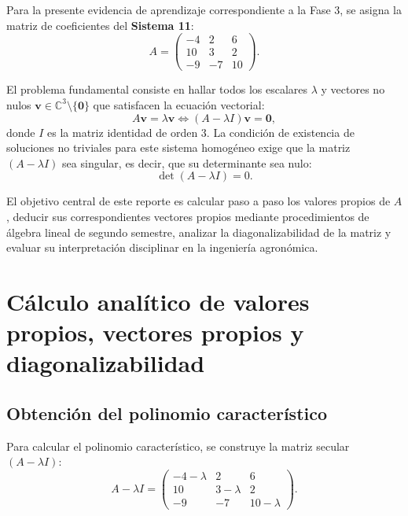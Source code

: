 \documentclass[spanish,letterpaper,oneside]{article}
\begin{document}
Para la presente evidencia de aprendizaje correspondiente a la Fase 3, se asigna la matriz de coeficientes del \textbf{Sistema 11}:
\begin{equation}\label{eq:matrizA}
A = \begin{pmatrix}
-4 & 2 & 6 \\
10 & 3 & 2 \\
-9 & -7 & 10
\end{pmatrix}.
\end{equation}

El problema fundamental consiste en hallar todos los escalares $\lambda$ y vectores no nulos $\mathbf{v} \in \mathbb{C}^3 \setminus \{\mathbf{0}\}$ que satisfacen la ecuación vectorial:
\begin{equation}\label{eq:def_propia}
A \mathbf{v} = \lambda \mathbf{v} \iff (A - \lambda I) \mathbf{v} = \mathbf{0},
\end{equation}
donde $I$ es la matriz identidad de orden 3. La condición de existencia de soluciones no triviales para este sistema homogéneo exige que la matriz $(A - \lambda I)$ sea singular, es decir, que su determinante sea nulo:
\begin{equation}\label{eq:secular}
\det(A - \lambda I) = 0.
\end{equation}

El objetivo central de este reporte es calcular paso a paso los valores propios de $A$, deducir sus correspondientes vectores propios mediante procedimientos de álgebra lineal de segundo semestre, analizar la diagonalizabilidad de la matriz y evaluar su interpretación disciplinar en la ingeniería agronómica.

\section{Cálculo analítico de valores propios, vectores propios y diagonalizabilidad}

\subsection{Obtención del polinomio característico}

Para calcular el polinomio característico, se construye la matriz secular $(A - \lambda I)$:
\begin{equation}
A - \lambda I = \begin{pmatrix}
-4 - \lambda & 2 & 6 \\
10 & 3 - \lambda & 2 \\
-9 & -7 & 10 - \lambda
\end{pmatrix}.
\end{equation}
\end{document}
